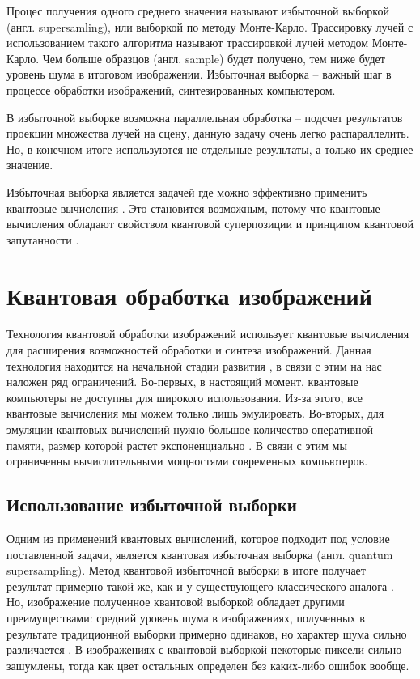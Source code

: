  Процес получения одного среднего значения называют избыточной выборкой (англ. supersamling), или выборкой по методу Монте-Карло. Трассировку лучей с использованием такого алгоритма называют трассировкой лучей методом Монте-Карло. Чем больше образцов (англ. sample) будет получено, тем ниже будет уровень шума в итоговом изображении. Избыточная выборка -- важный шаг в процессе обработки изображений, синтезированных компьютером.

В избыточной выборке возможна параллельная обработка -- подсчет результатов проекции множества лучей на сцену, данную задачу очень легко распараллелить. Но, в конечном итоге используются не отдельные результаты, а только их среднее значение. 

Избыточная выборка является задачей где можно эффективно применить квантовые вычисления \cite{PQC-classic}. Это становится возможным, потому что квантовые вычисления обладают свойством квантовой суперпозиции \cite{qsp} и принципом квантовой запутанности \cite{qtheory}.

\section{Квантовая обработка изображений}

Технология квантовой обработки изображений использует квантовые вычисления для расширения возможностей обработки и синтеза изображений. Данная технология находится на начальной стадии развития \cite{state}, в связи с этим на нас наложен ряд ограничений. Во-первых, в настоящий момент, квантовые компьютеры не доступны для широкого использования. Из-за этого, все квантовые вычисления мы можем только лишь эмулировать. Во-вторых, для эмуляции квантовых вычислений нужно большое количество оперативной памяти, размер которой растет экспоненциально \cite{emulating}. В связи с этим мы ограниченны вычислительными мощностями современных компьютеров.

\subsection{Использование избыточной выборки}

Одним из применений квантовых вычислений, которое подходит под условие поставленной задачи, является квантовая избыточная выборка (англ. quantum supersampling). Метод квантовой избыточной выборки в итоге получает результат примерно такой же, как и у существующего классического аналога \cite{PQC-classic}. Но, изображение полученное квантовой выборкой обладает другими преимуществами: средний уровень шума в изображениях, полученных в результате традиционной выборки примерно одинаков, но характер шума сильно различается \cite{PQC-classic}. В изображениях с квантовой выборкой некоторые пиксели сильно зашумлены, тогда как цвет остальных определен без каких-либо ошибок вообще.
 
